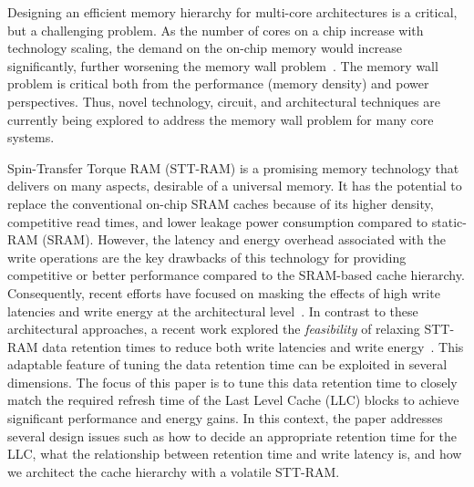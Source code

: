 
Designing an efficient memory hierarchy for multi-core architectures is a critical, but a challenging
problem. As the number of cores on a chip increase with technology scaling, the demand on the on-chip
memory would increase significantly, further worsening the memory wall problem~\cite{BurgerGK96}. The
memory wall problem is critical both from the performance (memory density) and power perspectives.
Thus, novel technology, circuit, and architectural techniques are currently being explored to address
the memory wall problem for many core systems.





Spin-Transfer Torque RAM (STT-RAM) is a promising memory technology that delivers on many aspects,
desirable of a universal memory. It has the potential to replace the conventional on-chip SRAM
caches because of its higher density, competitive read times, and lower leakage power consumption
compared to static-RAM (SRAM). However, the latency and energy overhead associated with the write operations are the key drawbacks
of this technology for providing competitive or better performance compared to the SRAM-based cache
hierarchy. Consequently, recent efforts have focused on masking the effects of high write latencies
and write energy at the architectural level~\cite{mram-energy-reduction,gsun-hpca}. In contrast to
these architectural approaches, a recent  work explored the {\it feasibility} of relaxing STT-RAM
data retention times to reduce both write latencies and write energy~\cite{STTRAM:HPCA11}. This
adaptable feature of tuning the data retention time can be exploited in several dimensions. The focus
of this paper is to tune this data retention time to closely match the required refresh time of the Last
Level Cache (LLC) blocks to achieve significant performance and energy gains. In this context, the paper
addresses several design issues such as how to decide an appropriate retention time for the LLC,
what the relationship between retention time and write latency is, and how we
architect the cache hierarchy with a volatile STT-RAM.

